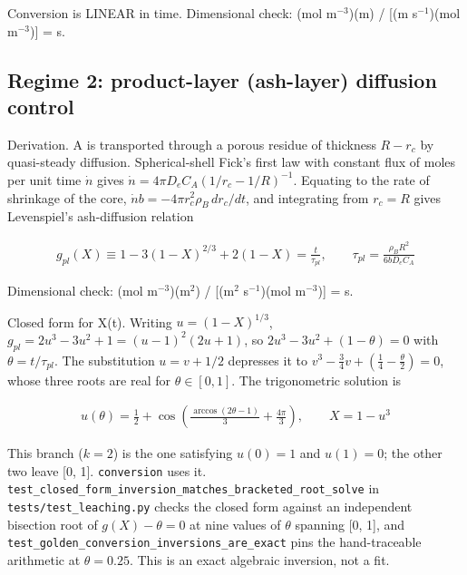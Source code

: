 \documentclass[10pt,a4paper,twoside]{report}
\begin{document}
Conversion is LINEAR in time. Dimensional check: (mol m$^{-3}$)(m) / [(m s$^{-1}$)(mol m$^{-3}$)] = s.

\subsection*{Regime 2: product-layer (ash-layer) diffusion control}

Derivation. A is transported through a porous residue of thickness $R - r_c$ by quasi-steady diffusion. Spherical-shell Fick's first law with constant flux of moles per unit time $\dot{n}$ gives $\dot{n} = 4\pi D_e C_A \left(1/r_c - 1/R\right)^{-1}$. Equating to the rate of shrinkage of the core, $\dot{n} b = -4\pi r_c^2 \rho_B \, dr_c/dt$, and integrating from $r_c = R$ gives Levenspiel's ash-diffusion relation

\begin{equation*}
\begin{gathered}
g_{pl}(X) \equiv 1 - 3(1-X)^{2/3} + 2(1-X) = \frac{t}{\tau_{pl}}, \qquad \boxed{\tau_{pl} = \frac{\rho_B R^2}{6 b D_e C_A}}
\end{gathered}
\end{equation*}

Dimensional check: (mol m$^{-3}$)(m$^{2}$) / [(m$^{2}$ s$^{-1}$)(mol m$^{-3}$)] = s.

Closed form for X(t). Writing $u = (1-X)^{1/3}$, $g_{pl} = 2u^3 - 3u^2 + 1 = (u-1)^2 (2u+1)$, so $2u^3 - 3u^2 + (1-\theta) = 0$ with $\theta = t/\tau_{pl}$. The substitution $u = v + 1/2$ depresses it to $v^3 - \tfrac{3}{4} v + \left(\tfrac{1}{4} - \tfrac{\theta}{2}\right) = 0$, whose three roots are real for $\theta \in [0,1]$. The trigonometric solution is

\begin{equation*}
\begin{gathered}
u(\theta) = \frac{1}{2} + \cos\!\left(\frac{\arccos(2\theta-1)}{3} + \frac{4\pi}{3}\right), \qquad X = 1 - u^3
\end{gathered}
\end{equation*}

This branch ($k=2$) is the one satisfying $u(0)=1$ and $u(1)=0$; the other two leave [0, 1]. \texttt{conversion} uses it. \texttt{test\_closed\_form\_inversion\_matches\_bracketed\_root\_solve} in \texttt{tests/test\_leaching.py} checks the closed form against an independent bisection root of $g(X) - \theta = 0$ at nine values of $\theta$ spanning [0, 1], and \texttt{test\_golden\_conversion\_inversions\_are\_exact} pins the hand-traceable arithmetic at $\theta = 0.25$. This is an exact algebraic inversion, not a fit.
\end{document}
